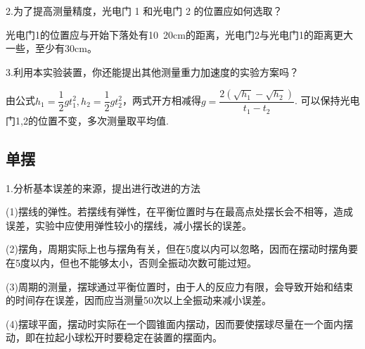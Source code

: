 \documentclass[11pt]{article}
\begin{document}
2.为了提高测量精度，光电门 1 和光电门 2 的位置应如何选取？

光电门1的位置应与开始下落处有10~20cm的距离，光电门2与光电门1的距离更大一些，至少有30cm。

3.利用本实验装置，你还能提出其他测量重力加速度的实验方案吗？

由公式$ h_1=\dfrac{1}{2}gt_1^2,h_2=\dfrac{1}{2}gt_2^2 $，两式开方相减得$ g=\dfrac{2(\sqrt{h_1}-\sqrt{h_2})}{t_1-t_2} $. 可以保持光电门1,2的位置不变，多次测量取平均值.
\subsection{单摆} 
1.分析基本误差的来源，提出进行改进的方法

(1)摆线的弹性。若摆线有弹性，在平衡位置时与在最高点处摆长会不相等，造成误差，实验中应使用弹性较小的摆线，减小摆长的误差。

(2)摆角，周期实际上也与摆角有关，但在5度以内可以忽略，因而在摆动时摆角要在5度以内，但也不能够太小，否则全振动次数可能过短。

(3)周期的测量，摆球通过平衡位置时，由于人的反应力有限，会导致开始和结束的时间存在误差，因而应当测量50次以上全振动来减小误差。

(4)摆球平面，摆动时实际在一个圆锥面内摆动，因而要使摆球尽量在一个面内摆动，即在拉起小球松开时要稳定在装置的摆面内。
\end{document}
